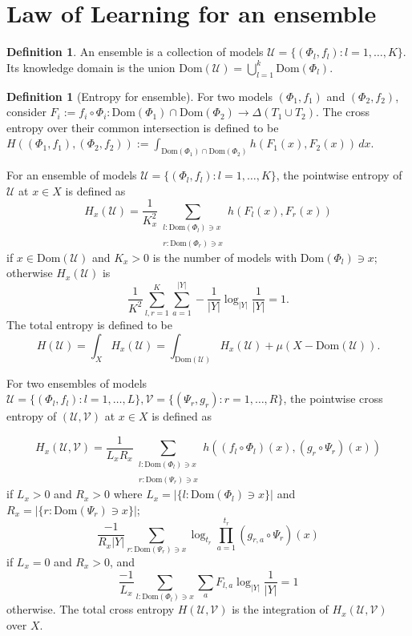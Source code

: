 \documentclass{article}
\theoremstyle{plain}
\theoremstyle{definition}
\newtheorem{definition}[theorem]{Definition}
\theoremstyle{remark}
\newcommand{\cU}{\mathcal{U}}
\newcommand{\Dom}{\mathrm{Dom}}
\begin{document}
\section{Law of Learning for an ensemble}
\begin{definition}
An ensemble is a collection of models $\cU = \{(\Phi_l,f_l): l=1,\ldots,K\}$. Its knowledge domain is the union $\Dom(\cU) = \bigcup_{l=1}^k \Dom(\Phi_l)$.
\end{definition}

\begin{definition}[Entropy for ensemble] \label{def:H(U)}
For two models $(\Phi_1,f_1)$ and $(\Phi_2,f_2)$, consider $F_i := f_i \circ \Phi_i: \Dom(\Phi_1) \cap \Dom(\Phi_2) \to \Delta(T_1 \cup T_2)$. The cross entropy over their common intersection is defined to be
$ H((\Phi_1,f_1),(\Phi_2,f_2)) := \int_{\Dom(\Phi_1) \cap \Dom(\Phi_2)} h(F_{1}(x),F_{2}(x)) \,dx. $

For an ensemble of models $\cU = \{(\Phi_l,f_l): l=1,\ldots,K\}$, 
the pointwise entropy of $\cU$ at $x \in X$ is defined as
\begin{equation} \label{eq:H_x(U)}
	H_x(\cU) = \frac{1}{K_x^2} \sum_{\substack{l: \Dom(\Phi_l)\ni x \\\\r: \Dom(\Phi_r)\ni x}} h(F_{l}(x),F_{r}(x))
\end{equation}
if $x \in \Dom(\cU)$ and $K_x>0$ is the number of models with $\Dom(\Phi_l) \ni x$; otherwise $H_x(\cU)$ is
$$\frac{1}{K^2} \sum_{l,r=1}^K \sum_{a=1}^{|Y|}-\frac{1}{|Y|}\log_{|Y|}\frac{1}{|Y|} = 1.$$
The total entropy is defined to be
\begin{equation} \label{eq:H(U)}
	H(\cU) = \int_X H_x(\cU) = \int_{\Dom(\cU)} H_x(\cU) + \mu(X-\Dom(\cU)).
\end{equation}


For two ensembles of models $\cU = \{(\Phi_l,f_l): l=1,\ldots,L\}, \mathcal{V} = \{(\Psi_r,g_r): r=1,\ldots,R\}$, the pointwise cross entropy of $(\cU,\mathcal{V})$ at $x \in X$ is defined as

\begin{equation} \label{eq:H_x(U,V)}
	H_x(\cU,\mathcal{V}) = \frac{1}{L_{x} R_{x}} \sum_{\substack{l: \Dom(\Phi_l)\ni x \\\\r: \Dom(\Psi_r)\ni x}} h((f_l\circ \Phi_{l})(x),(g_r\circ \Psi_r)(x))
\end{equation}
if $L_x >0$ and $R_x >0$ where $L_x = |\{l: \Dom(\Phi_l)\ni x\}|$ and $R_x = |\{r: \Dom(\Psi_r)\ni x\}|$; 
$$ \frac{-1}{R_x |Y|} \sum_{r: \Dom(\Psi_r)\ni x} \log_{t_r} \prod_{a=1}^{t_r} (g_{r,a}\circ \Psi_{r})(x) $$
if $L_x = 0$ and $R_x > 0$, and
$$ \frac{-1}{L_x} \sum_{l: \Dom(\Phi_l)\ni x} \sum_a F_{l,a} \log_{|Y|} \frac{1}{|Y|} = 1$$
otherwise. The total cross entropy $H(\cU,\mathcal{V})$ is the integration of $H_x(\cU,\mathcal{V})$ over $X$.


\end{definition}
\end{document}
